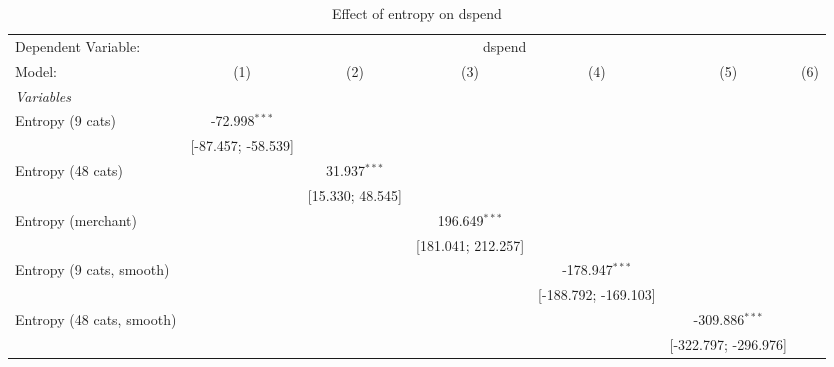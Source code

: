 
\begin{table}[htbp]
   \centering
   \tiny
   \begin{threeparttable}[b]
      \caption{\label{tab:reg_dspend} Effect of entropy on dspend}
      \begin{tabular}{lcccccc}
         \tabularnewline \midrule \midrule
         Dependent Variable: & \multicolumn{6}{c}{dspend}\\
         Model:                     & (1)                & (2)                & (3)                & (4)                  & (5)                  & (6)\\  
         \midrule
         \emph{Variables}\\
         Entropy (9 cats)           & -72.998$^{***}$    &                    &                    &                      &                      &   \\   
                                    & [-87.457; -58.539] &                    &                    &                      &                      &   \\   
         Entropy (48 cats)          &                    & 31.937$^{***}$     &                    &                      &                      &   \\   
                                    &                    & [15.330; 48.545]   &                    &                      &                      &   \\   
         Entropy (merchant)         &                    &                    & 196.649$^{***}$    &                      &                      &   \\   
                                    &                    &                    & [181.041; 212.257] &                      &                      &   \\   
         Entropy (9 cats, smooth)   &                    &                    &                    & -178.947$^{***}$     &                      &   \\   
                                    &                    &                    &                    & [-188.792; -169.103] &                      &   \\   
         Entropy (48 cats, smooth)  &                    &                    &                    &                      & -309.886$^{***}$     &   \\   
                                    &                    &                    &                    &                      & [-322.797; -296.976] &   \\   

\end{tabular}
\end{threeparttable}
\end{table}
